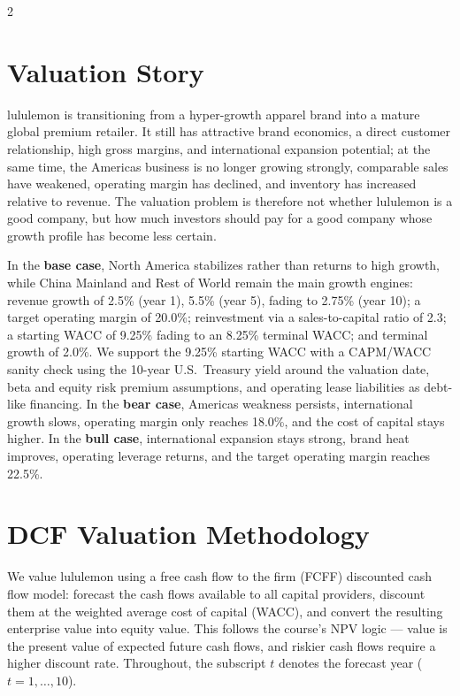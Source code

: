 \documentclass[a4paper]{CSMakotoTechnicalReport}
\begin{document}
\begin{multicols}{2}
\section{Valuation Story}

lululemon is transitioning from a hyper-growth apparel brand into a mature global premium retailer. It still has attractive brand economics, a direct customer relationship, high gross margins, and international expansion potential; at the same time, the Americas business is no longer growing strongly, comparable sales have weakened, operating margin has declined, and inventory has increased relative to revenue. The valuation problem is therefore not whether lululemon is a good company, but how much investors should pay for a good company whose growth profile has become less certain.

In the \textbf{base case}, North America stabilizes rather than returns to high growth, while China Mainland and Rest of World remain the main growth engines: revenue growth of 2.5\% (year 1), 5.5\% (year 5), fading to 2.75\% (year 10); a target operating margin of 20.0\%; reinvestment via a sales-to-capital ratio of 2.3; a starting WACC of 9.25\% fading to an 8.25\% terminal WACC; and terminal growth of 2.0\%. We support the 9.25\% starting WACC with a CAPM/WACC sanity check using the 10-year U.S.\ Treasury yield around the valuation date, beta and equity risk premium assumptions, and operating lease liabilities as debt-like financing. In the \textbf{bear case}, Americas weakness persists, international growth slows, operating margin only reaches 18.0\%, and the cost of capital stays higher. In the \textbf{bull case}, international expansion stays strong, brand heat improves, operating leverage returns, and the target operating margin reaches 22.5\%.

\end{multicols}

\section{DCF Valuation Methodology}

We value lululemon using a free cash flow to the firm (FCFF) discounted cash flow model: forecast the cash flows available to all capital providers, discount them at the weighted average cost of capital (WACC), and convert the resulting enterprise value into equity value. This follows the course's NPV logic --- value is the present value of expected future cash flows, and riskier cash flows require a higher discount rate. Throughout, the subscript $t$ denotes the forecast year ($t = 1, \dots, 10$).
\end{document}
